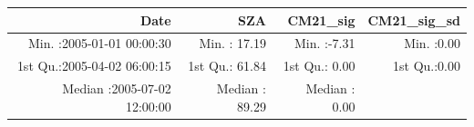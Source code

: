 \documentclass[
  10pt,
  a4paper,oneside]{article}
\begin{document}
\begin{longtable}[]{@{}rrrr@{}}
\toprule
\begin{minipage}[b]{0.34\columnwidth}\raggedleft
Date\strut
\end{minipage} & \begin{minipage}[b]{0.19\columnwidth}\raggedleft
SZA\strut
\end{minipage} & \begin{minipage}[b]{0.18\columnwidth}\raggedleft
CM21\_sig\strut
\end{minipage} & \begin{minipage}[b]{0.18\columnwidth}\raggedleft
CM21\_sig\_sd\strut
\end{minipage}\tabularnewline
\midrule
\endhead
\begin{minipage}[t]{0.34\columnwidth}\raggedleft
Min. :2005-01-01 00:00:30\strut
\end{minipage} & \begin{minipage}[t]{0.19\columnwidth}\raggedleft
Min. : 17.19\strut
\end{minipage} & \begin{minipage}[t]{0.18\columnwidth}\raggedleft
Min. :-7.31\strut
\end{minipage} & \begin{minipage}[t]{0.18\columnwidth}\raggedleft
Min. :0.00\strut
\end{minipage}\tabularnewline
\begin{minipage}[t]{0.34\columnwidth}\raggedleft
1st Qu.:2005-04-02 06:00:15\strut
\end{minipage} & \begin{minipage}[t]{0.19\columnwidth}\raggedleft
1st Qu.: 61.84\strut
\end{minipage} & \begin{minipage}[t]{0.18\columnwidth}\raggedleft
1st Qu.: 0.00\strut
\end{minipage} & \begin{minipage}[t]{0.18\columnwidth}\raggedleft
1st Qu.:0.00\strut
\end{minipage}\tabularnewline
\begin{minipage}[t]{0.34\columnwidth}\raggedleft
Median :2005-07-02 12:00:00\strut
\end{minipage} & \begin{minipage}[t]{0.19\columnwidth}\raggedleft
Median : 89.29\strut
\end{minipage} & \begin{minipage}[t]{0.18\columnwidth}\raggedleft
Median : 0.00\strut
\end{minipage} & \begin{minipage}[t]{0.18\columnwidth}\raggedleft

\end{minipage}
\end{longtable}
\end{document}
